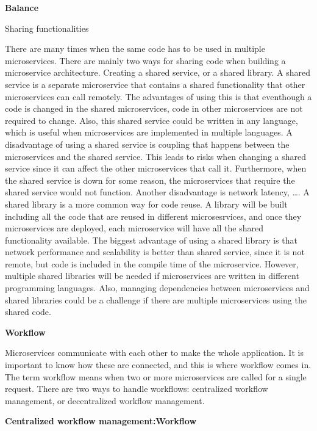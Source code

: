 \noindent \textbf{Balance}

\noindent Sharing functionalities

There are many times when the same code has to be used in multiple microservices. 
There are mainly two ways for sharing code when building a microservice architecture. 
Creating a shared service, or a shared library.  
A shared service is a separate microservice that contains a shared functionality that other microservices can call remotely.
The advantages of using this is that eventhough a code is changed in the shared microservices, code in other microservices are not required to change.
Also, this shared service could be written in any language, which is useful when microservices are implemented in multiple languages. 
A disadvantage of using a shared service is coupling that happens between the microservices and the shared service. 
This leads to risks when changing a shared service since it can affect the other microservices that call it.
Furthermore, when the shared service is down for some reason, the microservices that require the shared service would not function.
Another disadvantage is network latency, ….
A shared library is a more common way for code reuse. A library will be built including all the code that are reused in different microsesrvices,
and once they microservices are deployed, each microservice will have all the shared functionality available. 
The biggest advantage of using a shared library is that network performance and scalability is better than shared service, 
since it is not remote, but code is included in the compile time of the microservice. 
However, multiple shared libraries will be needed if microservices are written in different programming languages. 
Also, managing dependencies between microservices and shared libraries could be a challenge if there are multiple microservices using the shared code. 

\noindent \textbf{Workflow}

Microservices communicate with each other to make the whole application. It is important to know how these are connected, and this is where workflow comes in. The term workflow means when two or more microservices are called for a single request. There are two ways to handle workflows: centralized workflow management, or decentralized workflow management. 

\noindent \textbf{Centralized workflow management:Workflow}

